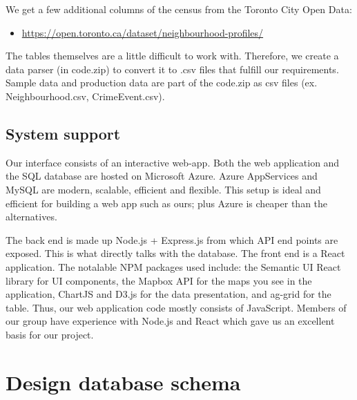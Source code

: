 \documentclass[12pt, a4paper]{article}
\begin{document}
We get a few additional columns of the census from the Toronto City Open Data:
\begin{itemize}

 \item \url{https://open.toronto.ca/dataset/neighbourhood-profiles/}
\end{itemize}
\color{black}
The tables themselves are a little difficult to work with. Therefore, we create a data parser (in code.zip) to convert it to .csv files that fulfill our requirements. Sample data and production data are part of the code.zip as csv files (ex. Neighbourhood.csv, CrimeEvent.csv).
\subsection*{System support}

\hspace{\parindent}Our interface consists of an interactive web-app. Both the web application and the SQL database are hosted on Microsoft Azure. Azure AppServices and MySQL are modern, scalable, efficient and flexible. This setup is ideal and efficient for building a web app such as ours; plus Azure is cheaper than the alternatives. 

The back end is made up Node.js + Express.js from which API end points are exposed. This is what directly talks with the database. The front end is a React application.  \color{blue}The notalable NPM packages used include: the Semantic UI React library for UI components, the Mapbox API for the maps you see in the application, ChartJS and D3.js for the data presentation, and ag-grid for the table.\color{black} Thus, our web application code mostly consists of JavaScript. Members of our group have experience with Node.js and React which gave us an excellent basis for our project.


\section*{Design database schema}
\end{document}
